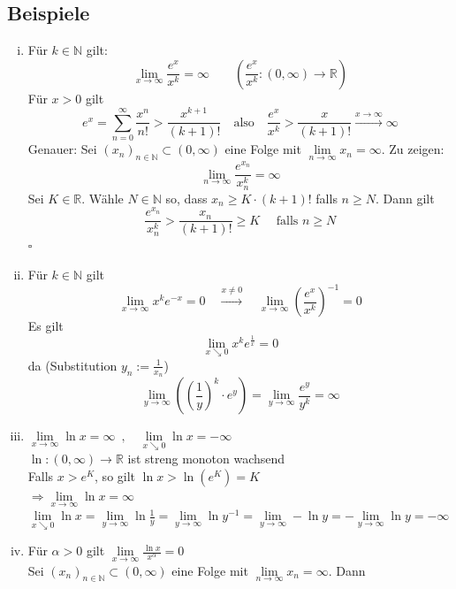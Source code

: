 \subsection{Beispiele} %
\label{sub:beispiele}
\begin{enumerate}[(i)]
	\item Für $k \in \mathds{N}$ gilt:
	\[
		\lim\limits_{x \to \infty} \frac{e^x}{x^k} = \infty \qquad \left( \frac{e^x}{x^k} : (0, \infty) \to \mathds{R} \right) 
	\]
	Für $x>0$ gilt
	\[
		e^x = \sum\limits_{n=0}^{\infty} \frac{x^n}{n!} > \frac{x^{k+1}}{(k+1)!} \quad \text{also} 
		\quad \frac{e^x}{x^k} > \frac{x}{(k+1)!}  \xrightarrow{x \to \infty} \infty
	\]
	Genauer: Sei $(x_n)_{n \in \mathds{N}} \subset (0, \infty)$ eine Folge mit $\lim\limits_{n \to \infty} x_n = \infty$. Zu zeigen:
	\[
		\lim\limits_{n \to \infty} \frac{e^{x_n}}{x_n^k} = \infty 
	\]
	Sei $K \in \mathds{R}$. Wähle $N \in \mathds{N}$ so, dass $x_n \ge K \cdot (k+1)!$ falls $n \ge N$. Dann gilt
	\[
		\frac{e^{x_n}}{x_n^k} > \frac{x_n}{(k+1)!} \ge K \quad \text{ falls } n \ge N  
	\]
	\hfill \( \square \)
	\item Für $k \in \mathds{N}$ gilt
	\[
		\lim\limits_{x \to \infty} x^k e^{-x} =0 \quad \xrightarrow{x \not= 0} \quad \lim\limits_{x \to \infty} \left( \frac{e^x}{x^k} \right)^{-1} =0 
		\tag{folgt aus Beispiel (i)}
	\]
	Es gilt
	\[
		\lim\limits_{x \searrow 0} x^k e^{\frac{1}{x} } = 0 
	\]
	da (Substitution $y_n := \frac{1}{x_n} $)
	\[
	\lim\limits_{y \to \infty} \left( \left( \frac{1}{y} \right)^k \cdot e^y \right) = \lim\limits_{y \to \infty} \frac{e^y}{y^k} = \infty 
	\]
	\item $\lim\limits_{x \to \infty} \ln x = \infty \enspace , \quad  \lim\limits_{x \searrow 0} \ln x = - \infty $
	\vspace{10pt} \\
	$\ln : (0, \infty) \to \mathds{R}$ ist streng monoton wachsend \\
	Falls $x >e^K$, so gilt $\ln x > \ln (e^K) = K$ \\
	$\Rightarrow \lim\limits_{x \to \infty} \ln x = \infty $ \\
	$\lim\limits_{x \searrow 0} \ln x = \lim\limits_{y \to \infty}  \ln \frac{1}{y} = \lim\limits_{y \to \infty} \ln y^{-1}
	= \lim\limits_{y \to \infty} - \ln y = - \lim\limits_{y \to \infty} \ln y = - \infty$
	\item Für $\alpha >0$ gilt $\lim\limits_{x \to \infty} \frac{\ln x}{x^{\alpha}} =0$ \\
	Sei $(x_n)_{n \in \mathds{N} } \subset (0, \infty)$ eine Folge mit $\lim\limits_{n \to \infty} x_n  = \infty$. Dann 

\end{enumerate}
